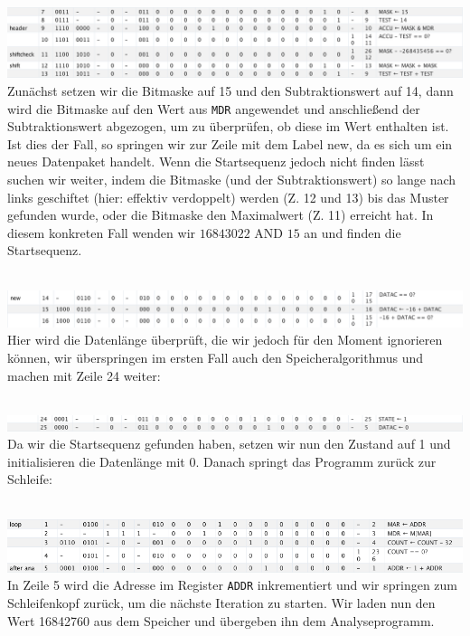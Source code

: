 \documentclass[12pt,titlepage]{article}
\begin{document}
\leavevmode \\
\includegraphics[width=16cm]{listing/row7-13.png}
\leavevmode \\
Zunächst setzen wir die Bitmaske auf 15 und den Subtraktionswert auf 14, dann
wird die Bitmaske auf den Wert aus \texttt{MDR} angewendet und anschließend der Subtraktionswert abgezogen, um
zu überprüfen, ob diese im Wert enthalten ist. Ist dies der Fall, so springen wir zur Zeile mit dem Label \dq new\dq, 
da es sich um ein neues Datenpaket handelt. Wenn die Startsequenz jedoch nicht finden l{\"a}sst suchen wir weiter, indem die Bitmaske (und der Subtraktionswert)
so lange nach links geschiftet (hier: effektiv verdoppelt) werden (Z. 12 und 13) bis das Muster gefunden wurde, oder die Bitmaske den Maximalwert (Z. 11) erreicht hat.
In diesem konkreten Fall wenden wir $16843022 \text{ AND } 15$ an und finden
die Startsequenz.

\leavevmode \\
\includegraphics[width=16cm]{listing/row14-16.png}
\leavevmode \\
Hier wird die Datenlänge überprüft, die wir jedoch für den Moment ignorieren können, wir überspringen im ersten Fall auch den Speicheralgorithmus und machen mit Zeile 24 weiter:

\leavevmode \\
\includegraphics[width=16cm]{listing/row24-25.png}
\leavevmode \\
Da wir die Startsequenz gefunden haben, setzen wir nun den Zustand auf 1 und initialisieren die Datenlänge mit 0. Danach springt
das Programm zurück zur Schleife:

\leavevmode \\
\includegraphics[width=16cm]{listing/row1-5.png}
\leavevmode \\
In Zeile 5 wird die Adresse im Register \texttt{ADDR} inkrementiert und wir springen zum Schleifenkopf zurück, um die nächste
Iteration zu starten. Wir laden nun den Wert 16842760 aus dem Speicher und übergeben ihn dem Analyseprogramm.
\end{document}

